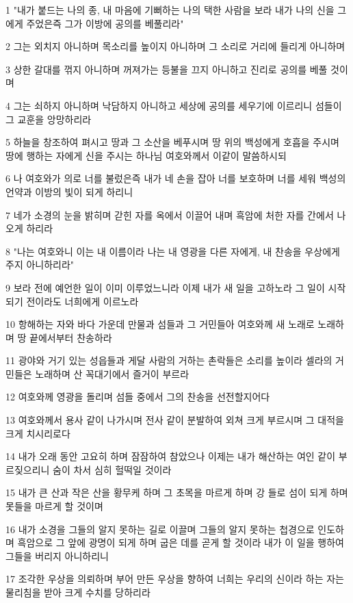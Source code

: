 \par 1 "내가 붙드는 나의 종, 내 마음에 기뻐하는 나의 택한 사람을 보라 내가 나의 신을 그에게 주었은즉 그가 이방에 공의를 베풀리라"
\par 2 그는 외치지 아니하며 목소리를 높이지 아니하며 그 소리로 거리에 들리게 아니하며
\par 3 상한 갈대를 꺾지 아니하며 꺼져가는 등불을 끄지 아니하고 진리로 공의를 베풀 것이며
\par 4 그는 쇠하지 아니하며 낙담하지 아니하고 세상에 공의를 세우기에 이르리니 섬들이 그 교훈을 앙망하리라
\par 5 하늘을 창조하여 펴시고 땅과 그 소산을 베푸시며 땅 위의 백성에게 호흡을 주시며 땅에 행하는 자에게 신을 주시는 하나님 여호와께서 이같이 말씀하시되
\par 6 나 여호와가 의로 너를 불렀은즉 내가 네 손을 잡아 너를 보호하며 너를 세워 백성의 언약과 이방의 빛이 되게 하리니
\par 7 네가 소경의 눈을 밝히며 갇힌 자를 옥에서 이끌어 내며 흑암에 처한 자를 간에서 나오게 하리라
\par 8 "나는 여호와니 이는 내 이름이라 나는 내 영광을 다른 자에게, 내 찬송을 우상에게 주지 아니하리라"
\par 9 보라 전에 예언한 일이 이미 이루었느니라 이제 내가 새 일을 고하노라 그 일이 시작되기 전이라도 너희에게 이르노라
\par 10 항해하는 자와 바다 가운데 만물과 섬들과 그 거민들아 여호와께 새 노래로 노래하며 땅 끝에서부터 찬송하라
\par 11 광야와 거기 있는 성읍들과 게달 사람의 거하는 촌락들은 소리를 높이라 셀라의 거민들은 노래하며 산 꼭대기에서 즐거이 부르라
\par 12 여호와께 영광을 돌리며 섬들 중에서 그의 찬송을 선전할지어다
\par 13 여호와께서 용사 같이 나가시며 전사 같이 분발하여 외쳐 크게 부르시며 그 대적을 크게 치시리로다
\par 14 내가 오래 동안 고요히 하며 잠잠하여 참았으나 이제는 내가 해산하는 여인 같이 부르짖으리니 숨이 차서 심히 헐떡일 것이라
\par 15 내가 큰 산과 작은 산을 황무케 하며 그 초목을 마르게 하며 강 들로 섬이 되게 하며 못들을 마르게 할 것이며
\par 16 내가 소경을 그들의 알지 못하는 길로 이끌며 그들의 알지 못하는 첩경으로 인도하며 흑암으로 그 앞에 광명이 되게 하며 굽은 데를 곧게 할 것이라 내가 이 일을 행하여 그들을 버리지 아니하리니
\par 17 조각한 우상을 의뢰하며 부어 만든 우상을 향하여 너희는 우리의 신이라 하는 자는 물리침을 받아 크게 수치를 당하리라
